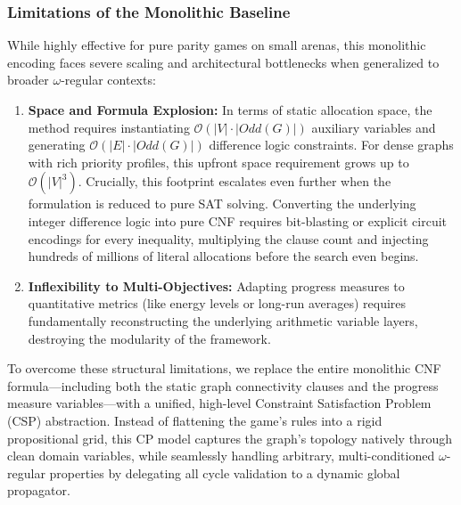 \documentclass[a4paper,fleqn]{cas-sc}
\begin{document}
\subsubsection{Limitations of the Monolithic Baseline}
While highly effective for pure parity games on small arenas, this monolithic encoding faces severe scaling and architectural bottlenecks when generalized to broader $\omega$-regular contexts:
\begin{enumerate}
     \item \textbf{Space and Formula Explosion:} In terms of static allocation space, the method requires instantiating $\mathcal{O}(|V| \cdot |\textit{Odd}(G)|)$ auxiliary variables and generating $\mathcal{O}(|E| \cdot |\textit{Odd}(G)|)$ difference logic constraints. For dense graphs with rich priority profiles, this upfront space requirement grows up to $\mathcal{O}(|V|^3)$. Crucially, this footprint escalates even further when the formulation is reduced to pure SAT solving. Converting the underlying integer difference logic into pure CNF requires bit-blasting or explicit circuit encodings for every inequality, multiplying the clause count and injecting hundreds of millions of literal allocations before the search even begins.
    \item \textbf{Inflexibility to Multi-Objectives:} Adapting progress measures to quantitative metrics (like energy levels or long-run averages) requires fundamentally reconstructing the underlying arithmetic variable layers, destroying the modularity of the framework.
\end{enumerate}

To overcome these structural limitations, we replace the entire monolithic CNF formula—including both the static graph connectivity clauses and the progress measure variables—with a unified, high-level Constraint Satisfaction Problem (CSP) abstraction. Instead of flattening the game's rules into a rigid propositional grid, this CP model captures the graph's topology natively through clean domain variables, while seamlessly handling arbitrary, multi-conditioned $\omega$-regular properties by delegating all cycle validation to a dynamic global propagator.
\end{document}
